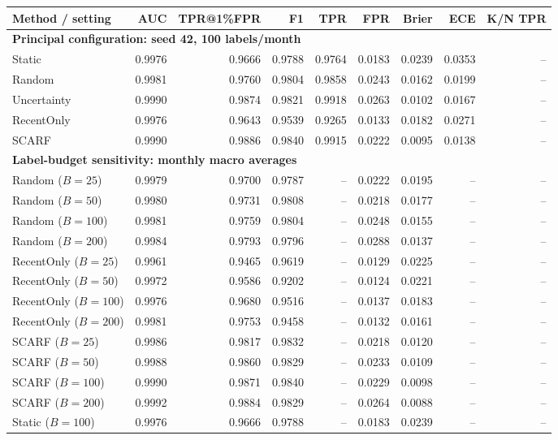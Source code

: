 \setlength{\tabcolsep}{3pt}
\begin{tabular}{lrrrrrrrr}
\toprule
Method / setting & AUC & TPR@1\%FPR & F1 & TPR & FPR & Brier & ECE & K/N TPR \\
\midrule
\multicolumn{9}{l}{\textbf{Principal configuration: seed 42, 100 labels/month}} \\
Static & 0.9976 & 0.9666 & 0.9788 & 0.9764 & 0.0183 & 0.0239 & 0.0353 & -- \\
Random & 0.9981 & 0.9760 & 0.9804 & 0.9858 & 0.0243 & 0.0162 & 0.0199 & -- \\
Uncertainty & 0.9990 & 0.9874 & 0.9821 & 0.9918 & 0.0263 & 0.0102 & 0.0167 & -- \\
RecentOnly & 0.9976 & 0.9643 & 0.9539 & 0.9265 & 0.0133 & 0.0182 & 0.0271 & -- \\
SCARF & 0.9990 & 0.9886 & 0.9840 & 0.9915 & 0.0222 & 0.0095 & 0.0138 & -- \\
\midrule
\multicolumn{9}{l}{\textbf{Label-budget sensitivity: monthly macro averages}} \\
Random ($B=25$) & 0.9979 & 0.9700 & 0.9787 & -- & 0.0222 & 0.0195 & -- & -- \\
Random ($B=50$) & 0.9980 & 0.9731 & 0.9808 & -- & 0.0218 & 0.0177 & -- & -- \\
Random ($B=100$) & 0.9981 & 0.9759 & 0.9804 & -- & 0.0248 & 0.0155 & -- & -- \\
Random ($B=200$) & 0.9984 & 0.9793 & 0.9796 & -- & 0.0288 & 0.0137 & -- & -- \\
RecentOnly ($B=25$) & 0.9961 & 0.9465 & 0.9619 & -- & 0.0129 & 0.0225 & -- & -- \\
RecentOnly ($B=50$) & 0.9972 & 0.9586 & 0.9202 & -- & 0.0124 & 0.0221 & -- & -- \\
RecentOnly ($B=100$) & 0.9976 & 0.9680 & 0.9516 & -- & 0.0137 & 0.0183 & -- & -- \\
RecentOnly ($B=200$) & 0.9981 & 0.9753 & 0.9458 & -- & 0.0132 & 0.0161 & -- & -- \\
SCARF ($B=25$) & 0.9986 & 0.9817 & 0.9832 & -- & 0.0218 & 0.0120 & -- & -- \\
SCARF ($B=50$) & 0.9988 & 0.9860 & 0.9829 & -- & 0.0233 & 0.0109 & -- & -- \\
SCARF ($B=100$) & 0.9990 & 0.9871 & 0.9840 & -- & 0.0229 & 0.0098 & -- & -- \\
SCARF ($B=200$) & 0.9992 & 0.9884 & 0.9829 & -- & 0.0264 & 0.0088 & -- & -- \\
Static ($B=100$) & 0.9976 & 0.9666 & 0.9788 & -- & 0.0183 & 0.0239 & -- & -- \\

\end{tabular}
